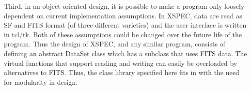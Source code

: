 Third, in an object oriented design, it is possible to make a program only loosely dependent on current implementation assumptions. In XSPEC, data are read as SF and FITS format (of three different varieties) and the user interface is written in tcl/tk. Both of these assumptions could be changed over the future life of the program. Thus the design of XSPEC, and any similar program, consists of defining an abstract Data\-Set class which has a subclass that uses FITS data. The virtual functions that support reading and writing can easily be overloaded by alternatives to FITS. Thus, the class library specified here fits in with the need for modularity in design.

